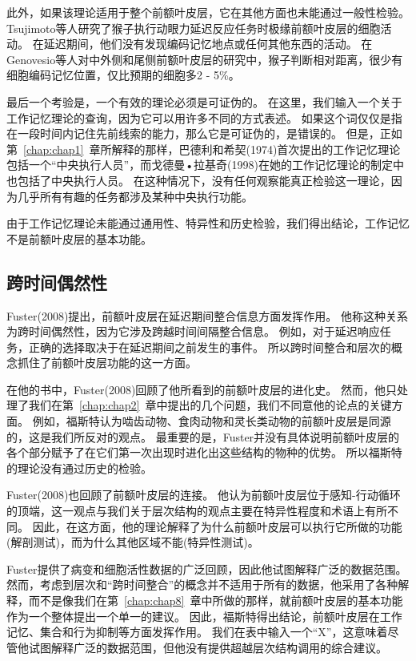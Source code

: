 此外，如果该理论适用于整个前额叶皮层，它在其他方面也未能通过一般性检验。
Tsujimoto等人\cite{tsujimoto2010evaluating}研究了猴子执行动眼力延迟反应任务时极缘前额叶皮层的细胞活动。
在延迟期间，他们没有发现编码记忆地点或任何其他东西的活动。
在Genovesio等人\cite{genovesio2011prefrontal}对中外侧和尾侧前额叶皮层的研究中，猴子判断相对距离，很少有细胞编码记忆位置，仅比预期的细胞多2 - 5\%。
\par


最后一个考验是，一个有效的理论必须是可证伪的。
在这里，我们输入一个关于工作记忆理论的查询，因为它可以用许多不同的方式表述。
如果这个词仅仅是指在一段时间内记住先前线索的能力，那么它是可证伪的，是错误的。
但是，正如第~\ref{chap:chap1}~章所解释的那样，巴德利和希契(1974)首次提出的工作记忆理论包括一个“中央执行人员”，而戈德曼•拉基奇(1998)在她的工作记忆理论的制定中也包括了中央执行人员。
在这种情况下，没有任何观察能真正检验这一理论，因为几乎所有有趣的任务都涉及某种中央执行功能。
\par


由于工作记忆理论未能通过通用性、特异性和历史检验，我们得出结论，工作记忆不是前额叶皮层的基本功能。



\subsection{跨时间偶然性}

Fuster(2008)提出，前额叶皮层在延迟期间整合信息方面发挥作用。
他称这种关系为跨时间偶然性，因为它涉及跨越时间间隔整合信息。
例如，对于延迟响应任务，正确的选择取决于在延迟期间之前发生的事件。
所以跨时间整合和层次的概念抓住了前额叶皮层功能的这一方面。
\par


在他的书中，Fuster(2008)回顾了他所看到的前额叶皮层的进化史。
然而，他只处理了我们在第~\ref{chap:chap2}~章中提出的几个问题，我们不同意他的论点的关键方面。
例如，福斯特认为啮齿动物、食肉动物和灵长类动物的前额叶皮层是同源的，这是我们所反对的观点。
最重要的是，Fuster并没有具体说明前额叶皮层的各个部分赋予了在它们第一次出现时进化出这些结构的物种的优势。
所以福斯特的理论没有通过历史的检验。


\par 
Fuster(2008)也回顾了前额叶皮层的连接。
他认为前额叶皮层位于感知-行动循环的顶端，这一观点与我们关于层次结构的观点主要在特异性程度和术语上有所不同。
因此，在这方面，他的理论解释了为什么前额叶皮层可以执行它所做的功能(解剖测试)，而为什么其他区域不能(特异性测试)。
\par


Fuster提供了病变和细胞活性数据的广泛回顾，因此他试图解释广泛的数据范围。
然而，考虑到层次和“跨时间整合”的概念并不适用于所有的数据，他采用了各种解释，而不是像我们在第~\ref{chap:chap8}~章中所做的那样，就前额叶皮层的基本功能作为一个整体提出一个单一的建议。
因此，福斯特得出结论，前额叶皮层在工作记忆、集合和行为抑制等方面发挥作用。
我们在表中输入一个“X”，这意味着尽管他试图解释广泛的数据范围，但他没有提供超越层次结构调用的综合建议。


